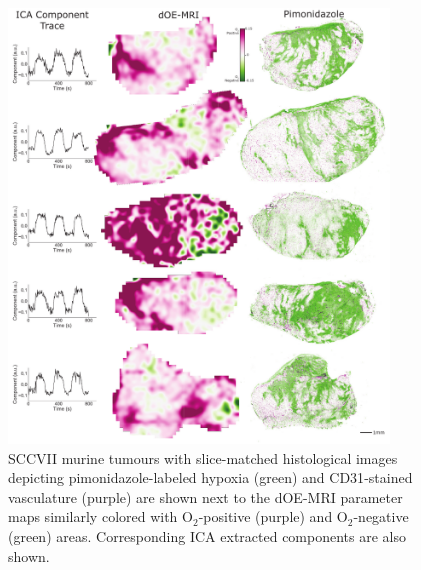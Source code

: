 \begin{figure}[htbp]
   \centering
   \includegraphics[width=0.9\textwidth]{oemri_thesis1/oemri_thesis1-images/fig6_sccvii.pdf} %
   \caption{SCCVII murine tumours with slice-matched histological images depicting pimonidazole-labeled hypoxia (green) and \acs{CD31}-stained vasculature (purple) are shown next to the \acs{dOE-MRI} parameter maps similarly colored with O$_2$-positive (purple) and O$_2$-negative (green) areas. Corresponding \acs{ICA} extracted components are also shown.
   \label{fig_sccvii}}
\end{figure}
